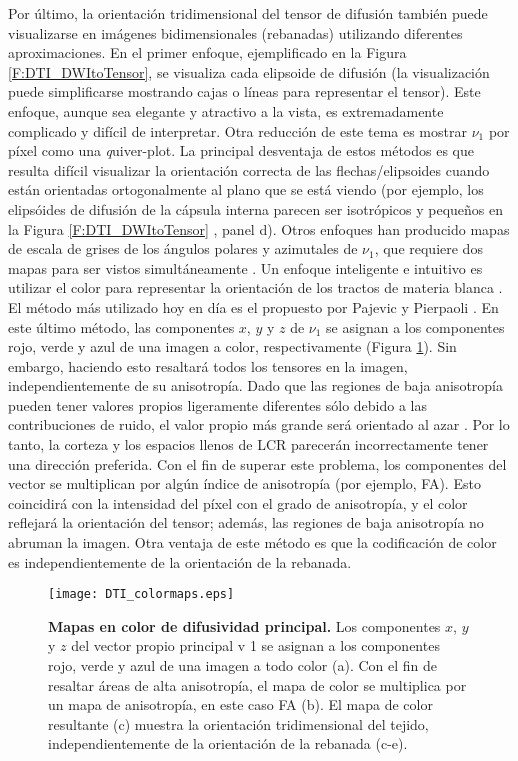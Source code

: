 Por último, la orientación tridimensional del tensor de difusión también puede visualizarse en imágenes bidimensionales (rebanadas) utilizando diferentes aproximaciones. En el primer enfoque, ejemplificado en la Figura \ref{F:DTI_DWItoTensor}, se visualiza cada elipsoide de difusión (la visualización puede simplificarse mostrando cajas o líneas para representar el tensor). Este enfoque, aunque sea elegante y atractivo a la vista, es extremadamente complicado y difícil de interpretar. Otra reducción de este tema es mostrar $\nu_1$ por píxel como una {\emph quiver-plot}. La principal desventaja de estos métodos es que resulta difícil visualizar la orientación correcta de las flechas/elipsoides cuando están orientadas ortogonalmente al plano que se está viendo (por ejemplo, los elipsóides de difusión de la cápsula interna parecen ser isotrópicos y pequeños en la Figura \ref{F:DTI_DWItoTensor} , panel d). Otros enfoques han producido mapas de escala de grises de los ángulos polares y azimutales de $\nu_1$, que requiere dos mapas para ser vistos simultáneamente \cite{Conturo_1996,Ulug_1994}. Un enfoque inteligente e intuitivo es utilizar el color para representar la orientación de los tractos de materia blanca \cite{Douek_1991,Jones_1997,Coremans_1994,Nakada_1995,Pierpaoli_1997,Jones_1997}. El método más utilizado hoy en día es el propuesto por Pajevic y Pierpaoli \cite{Pajevic_2000}. En este último método, las componentes $x$, $y$ y $z$ de $\nu_1$ se asignan a los componentes rojo, verde y azul de una imagen a color, respectivamente (Figura \ref{F:DTI_colormaps}). Sin embargo, haciendo esto resaltará todos los tensores en la imagen, independientemente de su anisotropía. Dado que las regiones de baja anisotropía pueden tener valores propios ligeramente diferentes sólo debido a las contribuciones de ruido, el valor propio más grande será orientado al azar \cite{Bastin_1998}. Por lo tanto, la corteza y los espacios llenos de LCR parecerán incorrectamente tener una dirección preferida. Con el fin de superar este problema, los componentes del vector se multiplican por algún índice de anisotropía (por ejemplo, FA). Esto coincidirá con la intensidad del píxel con el grado de anisotropía, y el color reflejará la orientación del tensor; además, las regiones de baja anisotropía no abruman la imagen. Otra ventaja de este método es que la codificación de color es independientemente de la orientación de la rebanada.

\begin{figure}
	\begin{figg}
    \texttt{[image: DTI\_colormaps.eps]}
    \caption{\textbf{Mapas en color de difusividad principal.} Los componentes $x$, $y$ y $z$ del vector propio principal v 1 se asignan a los componentes rojo, verde y azul de una imagen a todo color (a). Con el fin de resaltar áreas de alta anisotropía, el mapa de color se multiplica por un mapa de anisotropía, en este caso FA (b). El mapa de color resultante (c) muestra la orientación tridimensional del tejido, independientemente de la orientación de la rebanada (c-e).}
    \label{F:DTI_colormaps}
    \end{figg}
\end{figure}




